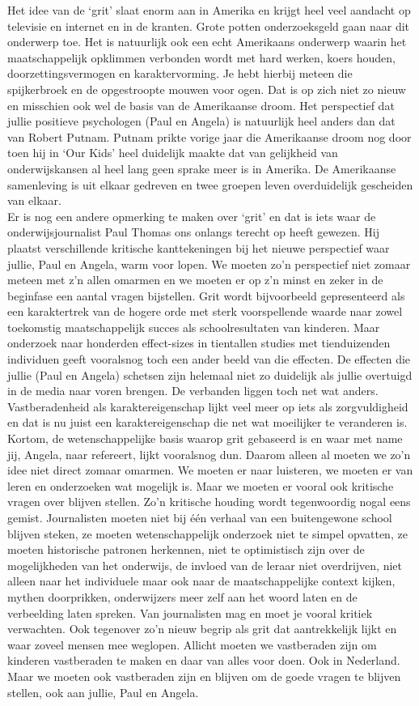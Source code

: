 \documentclass[]{book}
\begin{document}
Het idee van de `grit' slaat enorm aan in Amerika en krijgt heel veel
aandacht op televisie en internet en in de kranten. Grote potten
onderzoeksgeld gaan naar dit onderwerp toe. Het is natuurlijk ook een
echt Amerikaans onderwerp waarin het maatschappelijk opklimmen verbonden
wordt met hard werken, koers houden, doorzettingsvermogen en
karaktervorming. Je hebt hierbij meteen die spijkerbroek en de
opgestroopte mouwen voor ogen. Dat is op zich niet zo nieuw en misschien
ook wel de basis van de Amerikaanse droom. Het perspectief dat jullie
positieve psychologen (Paul en Angela) is natuurlijk heel anders dan dat
van Robert Putnam. Putnam prikte vorige jaar die Amerikaanse droom nog
door toen hij in `Our Kids' heel duidelijk maakte dat van gelijkheid van
onderwijskansen al heel lang geen sprake meer is in Amerika. De
Amerikaanse samenleving is uit elkaar gedreven en twee groepen leven
overduidelijk gescheiden van elkaar.\\
Er is nog een andere opmerking te maken over `grit' en dat is iets waar
de onderwijsjournalist Paul Thomas ons onlangs terecht op heeft gewezen.
Hij plaatst verschillende kritische kanttekeningen bij het nieuwe
perspectief waar jullie, Paul en Angela, warm voor lopen. We moeten zo'n
perspectief niet zomaar meteen met z'n allen omarmen en we moeten er op
z'n minst en zeker in de beginfase een aantal vragen bijstellen. Grit
wordt bijvoorbeeld gepresenteerd als een karaktertrek van de hogere orde
met sterk voorspellende waarde naar zowel toekomstig maatschappelijk
succes als schoolresultaten van kinderen. Maar onderzoek naar honderden
effect-sizes in tientallen studies met tienduizenden individuen geeft
vooralsnog toch een ander beeld van die effecten. De effecten die jullie
(Paul en Angela) schetsen zijn helemaal niet zo duidelijk als jullie
overtuigd in de media naar voren brengen. De verbanden liggen toch net
wat anders. Vastberadenheid als karaktereigenschap lijkt veel meer op
iets als zorgvuldigheid en dat is nu juist een karaktereigenschap die
net wat moeilijker te veranderen is. Kortom, de wetenschappelijke basis
waarop grit gebaseerd is en waar met name jij, Angela, naar refereert,
lijkt vooralsnog dun. Daarom alleen al moeten we zo'n idee niet direct
zomaar omarmen. We moeten er naar luisteren, we moeten er van leren en
onderzoeken wat mogelijk is. Maar we moeten er vooral ook kritische
vragen over blijven stellen. Zo'n kritische houding wordt tegenwoordig
nogal eens gemist. Journalisten moeten niet bij één verhaal van een
buitengewone school blijven steken, ze moeten wetenschappelijk onderzoek
niet te simpel opvatten, ze moeten historische patronen herkennen, niet
te optimistisch zijn over de mogelijkheden van het onderwijs, de invloed
van de leraar niet overdrijven, niet alleen naar het individuele maar
ook naar de maatschappelijke context kijken, mythen doorprikken,
onderwijzers meer zelf aan het woord laten en de verbeelding laten
spreken. Van journalisten mag en moet je vooral kritiek verwachten. Ook
tegenover zo'n nieuw begrip als grit dat aantrekkelijk lijkt en waar
zoveel mensen mee weglopen. Allicht moeten we vastberaden zijn om
kinderen vastberaden te maken en daar van alles voor doen. Ook in
Nederland. Maar we moeten ook vastberaden zijn en blijven om de goede
vragen te blijven stellen, ook aan jullie, Paul en Angela.
\end{document}
